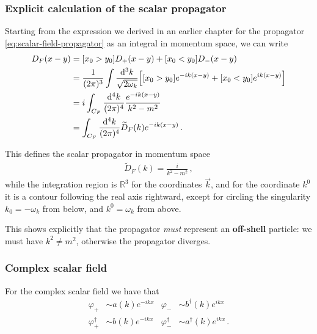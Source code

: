 \documentclass[main.tex]{subfiles}
\begin{document}
\subsubsection{Explicit calculation of the scalar propagator}

Starting from the expression we derived in an earlier chapter for the propagator \eqref{eq:scalar-field-propagator} as an integral in momentum space, we can write 
%
\begin{subequations} 
\begin{align}
D_F (x-y) &= [x_0 > y_0 ] D_+ (x-y) + [x_0 < y_0 ] D_- (x-y)  \\
&= \frac{1}{(2 \pi )^3} \int \frac{ \dd[3]{k}}{\sqrt{2 \omega_{k}}}
\qty[[x_0 > y_0 ] e^{-ik(x-y)} + [x_0 < y_0 ] e^{ik(x-y)}]  \\
&= i \int_{C_F} \frac{ \dd[4]{k}}{(2 \pi )^{4}}\frac{e^{-ik(x-y)}}{k^2-m^2}\\
&= \int_{C_F} \frac{ \dd[4]{k}}{(2 \pi )^{4}} \widetilde{D}_{F} (k) e^{-ik (x-y)} \label{eq:fermion-propagator-momentum-space}
\,.
\end{align}
\end{subequations}

This defines the scalar propagator in momentum space 
%
\begin{align}
\widetilde{D}_{F}(k) = \frac{i}{k^2- m^2}
\,,
\end{align}
%
while the integration region is \(\mathbb{R}^{3}\) for the coordinates \(\vec{k}\), and for the coordinate \(k^{0}\) it is a contour following the real axis rightward, except for circling the singularity \(k_0 = - \omega_{k}\) from below, and \(k^{0} = \omega_{k}\) from above. 

This shows explicitly that the propagator \emph{must} represent an \textbf{off-shell} particle: we must have \(k^2 \neq m^2\), otherwise the propagator diverges.

\subsubsection{Complex scalar field}

For the complex scalar field we have that 
%
\begin{subequations}
\begin{align}
\varphi_{+} &\sim a(k) e^{-ikx} 
&
\varphi_{-} &\sim b ^\dag(k) e^{ikx}  \\
\varphi_{+}^\dag &\sim b(k) e^{-ikx} 
&
\varphi_{-}^\dag &\sim a ^\dag(k) e^{ikx}
\,.
\end{align}
\end{subequations}
\end{document}
